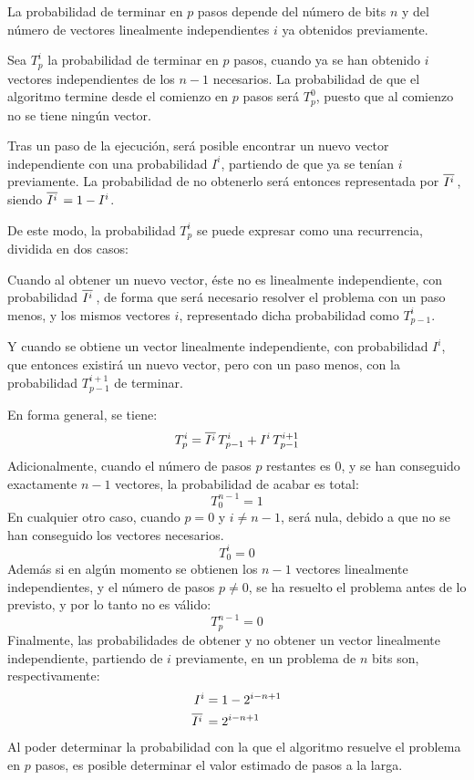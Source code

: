La probabilidad de terminar en $p$ pasos depende del número de bits $n$ y del 
número de vectores linealmente independientes $i$ ya obtenidos previamente.  

Sea $T^i_p$ la probabilidad de terminar en $p$ pasos, cuando ya se han obtenido 
$i$ vectores independientes de los $n-1$ necesarios. La probabilidad de que el 
algoritmo termine desde el comienzo en $p$ pasos será $T^0_p$, puesto que al 
comienzo no se tiene ningún vector.

Tras un paso de la ejecución, será posible encontrar un nuevo vector 
independiente con una probabilidad $I^i$, partiendo de que ya se tenían $i$ 
previamente. La probabilidad de no obtenerlo será entonces representada por $\overline{I^{i}}\,$, siendo $\overline{I^{i}}\, = 1 - I^i$.

De este modo, la probabilidad $T^i_p$ se puede expresar como una recurrencia, 
dividida en dos casos:

Cuando al obtener un nuevo vector, éste no es linealmente independiente, con 
probabilidad $\overline{I^{i}}\,$, de forma que será necesario resolver el problema con un 
paso menos, y los mismos vectores $i$, representado dicha probabilidad como 
$T^i_{p-1}$.

Y cuando se obtiene un vector linealmente independiente, con probabilidad $I^i$, 
que entonces existirá un nuevo vector, pero con un paso menos, con la 
probabilidad $T^{i+1}_{p-1}$ de terminar.

En forma general, se tiene:
%
\begin{equation}
	\label{eq:rec_T}
	T^i_p = \overline{I^{i}}\, T^i_{p-1} + I^i \, T^{i+1}_{p-1}
\end{equation}
%
Adicionalmente, cuando el número de pasos $p$ restantes es 0, y se han 
conseguido exactamente $n-1$ vectores, la probabilidad de acabar es total:
%
$$ T^{n-1}_0 = 1 $$
%
En cualquier otro caso, cuando $p = 0$ y $i \neq n-1$, será nula, debido a que 
no se han conseguido los vectores necesarios.
%
$$ T^i_0 = 0 $$
%
Además si en algún momento se obtienen los $n-1$ vectores linealmente 
independientes, y el número de pasos $p \neq 0$, se ha resuelto el problema 
antes de lo previsto, y por lo tanto no es válido:
%
$$ T^{n-1}_p = 0$$
%
Finalmente, las probabilidades de obtener y no obtener un vector linealmente 
independiente, partiendo de $i$ previamente, en un problema de $n$ bits son, 
respectivamente:
\begin{equation}
\begin{split}
	I^i & = 1 - 2^{i-n+1}
\\
	\overline{I^{i}}\, & = 2^{i-n+1}
\end{split}
\end{equation}
%
Al poder determinar la probabilidad con la que el algoritmo resuelve el problema 
en $p$ pasos, es posible determinar el valor estimado de pasos a la larga.

